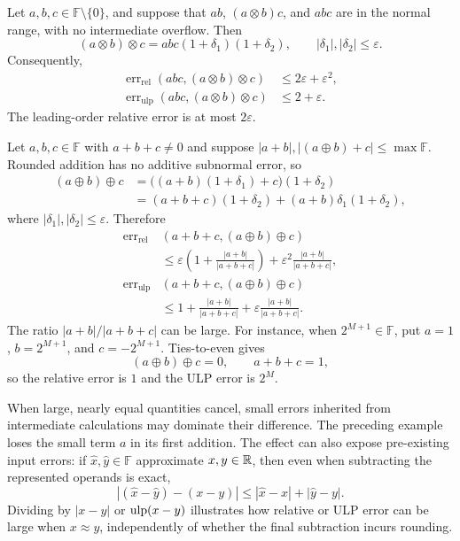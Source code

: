 \begin{example}
Let $a, b, c\in\mathbb F\setminus\{0\}$, and suppose that
$ab$, $(a\otimes b)c$, and $abc$ are in the normal range,
with no intermediate overflow. Then
\[
 (a\otimes b)\otimes c
 =abc(1+\delta_1)(1+\delta_2),
 \qquad|\delta_1|, |\delta_2|\le\varepsilon.
\]
Consequently,
\[
 \begin{aligned}
 \operatorname{err}_{\mathrm{rel}}
  (abc, (a\otimes b)\otimes c)
 &\le2\varepsilon+\varepsilon^2, \\
 \operatorname{err}_{\mathrm{ulp}}
  (abc, (a\otimes b)\otimes c)
 &\le2+\varepsilon.
 \end{aligned}
\]
The leading-order relative error is at most $2\varepsilon$.
\end{example}

\begin{example}
Let $a, b, c\in\mathbb F$ with $a+b+c\ne0$ and suppose
$|a+b|, |(a\oplus b)+c|\le\max\mathbb F$.
Rounded addition has no additive subnormal error, so
\[
 \begin{aligned}
 (a\oplus b)\oplus c
 &=\bigl((a+b)(1+\delta_1)+c\bigr)(1+\delta_2)\\
 &=(a+b+c)(1+\delta_2)
  +(a+b)\delta_1(1+\delta_2),
 \end{aligned}
\]
where $|\delta_1|, |\delta_2|\le\varepsilon$. Therefore
\[
 \begin{aligned}
 \operatorname{err}_{\mathrm{rel}}
 &(a+b+c, (a\oplus b)\oplus c)\\
 &\le\varepsilon\left(1+\frac{|a+b|}{|a+b+c|}\right)
 +\varepsilon^2\frac{|a+b|}{|a+b+c|}, \\
 \operatorname{err}_{\mathrm{ulp}}
 &(a+b+c, (a\oplus b)\oplus c)\\
 &\le1+\frac{|a+b|}{|a+b+c|}
 +\varepsilon\frac{|a+b|}{|a+b+c|}.
 \end{aligned}
\]
The ratio $|a+b|/|a+b+c|$ can be large. For instance, when
$2^{M+1}\in\mathbb F$, put $a=1$, $b=2^{M+1}$, and
$c=-2^{M+1}$. Ties-to-even gives
\[
 (a\oplus b)\oplus c=0,
 \qquad a+b+c=1,
\]
so the relative error is $1$ and the ULP error is $2^M$.
\end{example}

\begin{remark}
When large, nearly equal quantities cancel, small errors inherited
from intermediate calculations may dominate their difference.
The preceding example loses the small term $a$ in its first addition.
The effect can also expose pre-existing input errors: if
$\widehat{x}, \widehat{y}\in\mathbb F$ approximate $x, y\in\mathbb{R}$,
then even when subtracting the represented operands is exact,
\[
 |(\widehat{x}-\widehat{y})-(x-y)|
 \le|\widehat{x}-x|+|\widehat{y}-y|.
\]
Dividing by $|x-y|$ or $\operatorname{ulp}(x-y)$ illustrates how relative or
ULP error can be large when $x\approx y$, independently of
whether the final subtraction incurs rounding.
\end{remark}

